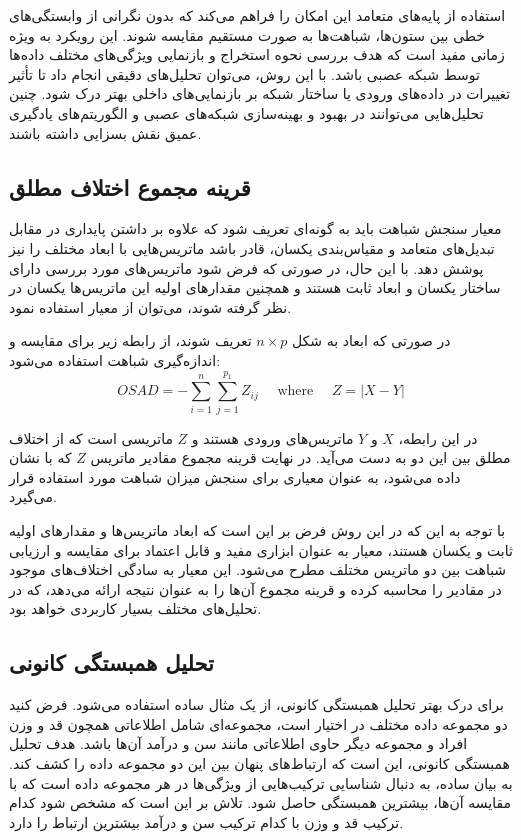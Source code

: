 استفاده از پایه‌های متعامد این امکان را فراهم می‌کند که بدون نگرانی از وابستگی‌های خطی بین ستون‌ها، شباهت‌ها به صورت مستقیم مقایسه شوند. این رویکرد به ویژه زمانی مفید است که هدف بررسی نحوه استخراج و بازنمایی ویژگی‌های مختلف داده‌ها توسط شبکه عصبی باشد. با این روش، می‌توان تحلیل‌های دقیقی انجام داد تا تأثیر تغییرات در داده‌های ورودی یا ساختار شبکه بر بازنمایی‌های داخلی بهتر درک شود. چنین تحلیل‌هایی می‌توانند در بهبود و بهینه‌سازی شبکه‌های عصبی و الگوریتم‌های یادگیری عمیق نقش بسزایی داشته باشند.


\subsection{
	قرینه مجموع اختلاف مطلق%
}
معیار سنجش شباهت باید به گونه‌ای تعریف شود که علاوه بر داشتن پایداری در مقابل تبدیل‌های متعامد و مقیاس‌بندی یکسان، قادر باشد ماتریس‌هایی با ابعاد مختلف را نیز پوشش دهد. با این حال، در صورتی که فرض شود ماتریس‌های مورد بررسی دارای ساختار یکسان و ابعاد ثابت هستند و همچنین مقدار‌های اولیه این ماتریس‌ها یکسان در نظر گرفته شوند، می‌توان از معیار
استفاده نمود.

در صورتی که ابعاد به شکل \( n \times p \) تعریف شوند، از رابطه زیر برای مقایسه و اندازه‌گیری شباهت استفاده می‌شود:
\begin{equation}
	OSAD = -\sum_{i=1}^n \sum_{j=1}^{p_1} Z_{ij}
	\quad \text { where } \quad
	Z = |X-Y|
\end{equation}

در این رابطه، \( X \) و \( Y \) ماتریس‌های ورودی هستند و \( Z \) ماتریسی است که از اختلاف مطلق بین این دو به دست می‌آید. در نهایت قرینه مجموع مقادیر ماتریس \( Z \) که با
نشان داده می‌شود، به عنوان معیاری برای سنجش میزان شباهت مورد استفاده قرار می‌گیرد.

با توجه به این که در این روش فرض بر این است که ابعاد ماتریس‌ها و مقدار‌های اولیه ثابت و یکسان هستند، معیار
به عنوان ابزاری مفید و قابل اعتماد برای مقایسه و ارزیابی شباهت بین دو ماتریس مختلف مطرح می‌شود. این معیار به سادگی اختلاف‌های موجود در مقادیر را محاسبه کرده و قرینه مجموع آن‌ها را به عنوان نتیجه ارائه می‌دهد، که در تحلیل‌های مختلف بسیار کاربردی خواهد بود.




\subsection{
	تحلیل همبستگی کانونی%
}
برای درک بهتر تحلیل همبستگی کانونی، از یک مثال ساده استفاده می‌شود. فرض کنید دو مجموعه داده مختلف در اختیار است، مجموعه‌ای شامل اطلاعاتی همچون قد و وزن افراد و مجموعه دیگر حاوی اطلاعاتی مانند سن و درآمد آن‌ها باشد. هدف تحلیل همبستگی کانونی، این است که ارتباط‌های پنهان بین این دو مجموعه داده را کشف کند. به بیان ساده،
به دنبال شناسایی ترکیب‌هایی از ویژگی‌ها در هر مجموعه داده است که با مقایسه آن‌ها، بیشترین همبستگی حاصل شود. تلاش بر این است که مشخص شود کدام ترکیب قد و وزن با کدام ترکیب سن و درآمد بیشترین ارتباط را دارد.

